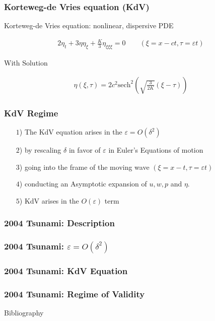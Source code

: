 \documentclass[fleqn]{beamer}
\begin{document}
    \begin{frame}
        \frametitle{Korteweg-de Vries equation (KdV)}
        Korteweg-de Vries equation: nonlinear, dispersive PDE
        \begin{ceqn}
        \begin{align}
            2\eta_t + 3 \eta \eta_\xi + \frac{K}{3} \eta_{\xi\xi\xi} =
            0\qquad \left(\xi = x-ct, \tau = \varepsilon t\right)\nonumber
        \end{align}
        \end{ceqn}
        With Solution
        \begin{ceqn}
        \begin{align}
            \eta(\xi, \tau) = 2c^2 \text{sech}^2\left( \sqrt{\frac{3}{2K}}
            \left(\xi- \tau\right)  \right)\nonumber
        \end{align}
        \end{ceqn}
    \end{frame}

    \begin{frame}
        \frametitle{KdV Regime}
        \begin{itemize}
            \item[$1$)]  The KdV equation arises in the $\varepsilon = O(\delta^2)$
            \item[$2$)] by rescaling $\delta$ in favor of $\varepsilon$ in
                Euler's Equations of motion
            \item[$3$)] going into the frame of the moving wave $(\xi = x- t, \tau = \varepsilon t)$
            \item[$4$)] conducting an Asymptotic expansion of $u , w, p$ and $\eta$.
            \item[$5$)] KdV arises in the $O(\varepsilon)$ term
        \end{itemize}
    \end{frame}

    \begin{frame}
        \frametitle{2004 Tsunami: Description}
    \end{frame}

    \begin{frame}
        \frametitle{2004 Tsunami: $\varepsilon=O\left(\delta^2\right)$}
    \end{frame}

    \begin{frame}
        \frametitle{2004 Tsunami: KdV Equation}
    \end{frame}

    \begin{frame}
        \frametitle{2004 Tsunami: Regime of Validity}
    \end{frame}

    \begin{frame}{Bibliography}
        \nocite{johnson_1997}
        \nocite{vallis_2017}
        \nocite{constantin_tsunami}
        \nocite{rupert_2009}
        \nocite{mathe-physik}
        \printbibliography
    \end{frame}
\end{document}
